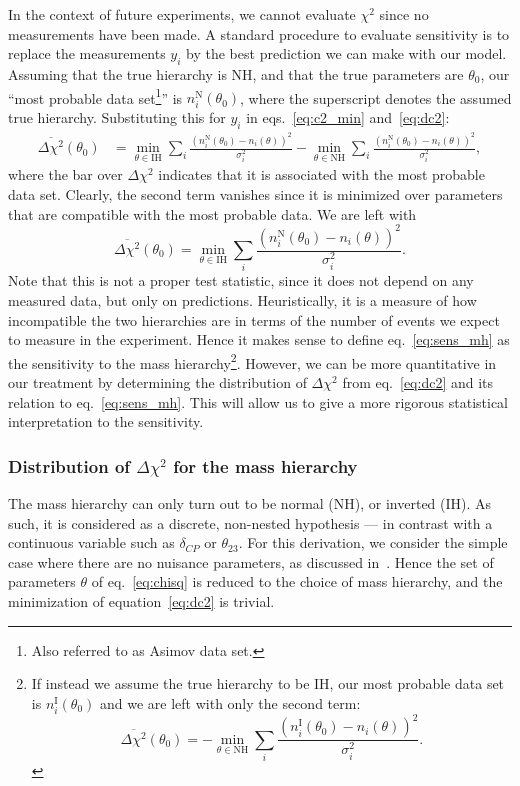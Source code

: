 In the context of future experiments, we cannot evaluate $\chi^2$ since no
measurements have been made. A standard procedure\cite{blennow} to evaluate
sensitivity is to replace the
measurements $y_i$ by the best prediction we can make with our model. Assuming
that the true hierarchy is NH, and that the true parameters are $\theta_0$, our
``most probable data set\footnote{Also referred to as Asimov data set.}'' is
$n^\text{N}_i(\theta_0)$, where the superscript denotes the assumed true
hierarchy. Substituting this for $y_i$ in eqs.~\ref{eq:c2_min} and~\ref{eq:dc2}:
\begin{align*}
	\overline{\Delta\chi^2} (\theta_0) &= \min_{\theta \in \text{IH}}
\sum_i \frac{(n^\text{N}_i(\theta_0) - n_i (\theta))^2}{\sigma^2_i}
- \min_{\theta \in \text{NH}}
\sum_i \frac{(n^\text{N}_i(\theta_0) - n_i (\theta))^2}{\sigma^2_i},
\end{align*}
where the bar over $\Delta\chi^2$ indicates that it is associated with the most
probable data set. Clearly, the second term vanishes since it is minimized
over parameters that are compatible with the most probable data. We are left
with
\begin{equation}
	\overline{\Delta\chi^2} (\theta_0) = \min_{\theta \in \text{IH}}
	\sum_i \frac{(n^\text{N}_i(\theta_0) - n_i
	(\theta))^2}{\sigma^2_i}.\label{eq:sens_mh}
\end{equation}
Note that this is not a proper test statistic, since it does not depend on any
measured data, but only on predictions. Heuristically, it is a measure of how
incompatible the two hierarchies are in terms of the number of events we expect
to measure in the experiment. Hence it makes sense to define
eq.~\ref{eq:sens_mh} as the sensitivity to the mass hierarchy\footnote{If
instead we assume the true hierarchy to be IH, our most probable data set is
$n^\text{I}_i(\theta_0)$ and we are left with only the second term:
\begin{equation*}
	\overline{\Delta\chi^2} (\theta_0) = -\min_{\theta \in \text{NH}}
	\sum_i \frac{(n^\text{I}_i(\theta_0) - n_i
	(\theta))^2}{\sigma^2_i}.
\end{equation*}}.
However, we can be more quantitative in our treatment by determining the
distribution of $\Delta\chi^2$ from eq.~\ref{eq:dc2} and its relation to
eq.~\ref{eq:sens_mh}. 
This will allow us to give a more rigorous statistical interpretation to the
sensitivity.




\subsubsection{Distribution of $\Delta \chi^2$ for the mass hierarchy}
The mass hierarchy can only turn out to be normal (NH), or inverted (IH). As
such, it is considered as a discrete, non-nested hypothesis --- in contrast with a continuous
variable such as $\delta_{CP}$ or $\theta_{23}$. For this derivation, we consider the simple case
where there are no nuisance parameters, as discussed in~\cite{ciuffoli, qian}.
Hence the set of parameters $\theta$ of eq.~\ref{eq:chisq} is reduced to the
choice of mass hierarchy, and the minimization of equation~\ref{eq:dc2} is trivial.

